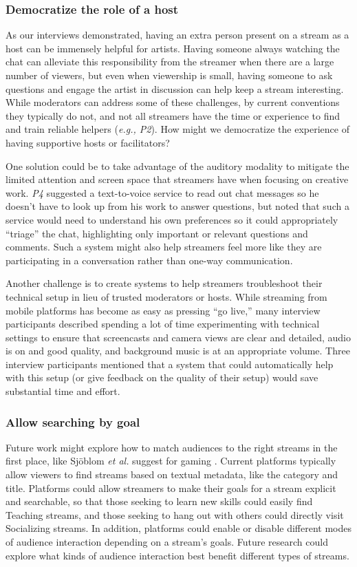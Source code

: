 \subsubsection{Democratize the role of a host}
As our interviews demonstrated, having an extra person present on a stream as a host can be immensely helpful for artists. Having someone always watching the chat can alleviate this responsibility from the streamer when there are a large number of viewers, but even when viewership is small, having someone to ask questions and engage the artist in discussion can help keep a stream interesting. While moderators can address some of these challenges, by current conventions they typically do not, and not all streamers have the time or experience to find and train reliable helpers (\textit{e.g., P2}). How might we democratize the experience of having supportive hosts or facilitators?

One solution could be to take advantage of the auditory modality to mitigate the limited attention and screen space that streamers have when focusing on creative work. \textit{P4} suggested a text-to-voice service to read out chat messages so he doesn't have to look up from his work to answer questions, but noted that such a service would need to understand his own preferences so it could appropriately ``triage'' the chat, highlighting only important or relevant questions and comments. Such a system might also help streamers feel more like they are participating in a conversation rather than one-way communication.

Another challenge is to create systems to help streamers troubleshoot their technical setup in lieu of trusted moderators or hosts. While streaming from mobile platforms has become as easy as pressing ``go live,'' many interview participants described spending a lot of time experimenting with technical settings to ensure that screencasts and camera views are clear and detailed, audio is on and good quality, and background music is at an appropriate volume. Three interview participants mentioned that a system that could automatically help with this setup (or give feedback on the quality of their setup) would save substantial time and effort. 

\subsubsection{Allow searching by goal}
Future work might explore how to match audiences to the right streams in the first place, like Sj{\"{o}}blom \emph{et al.} suggest for gaming \cite{Sjoblom2017a}. Current platforms typically allow viewers to find streams based on textual metadata, like the category and title. Platforms could allow streamers to make their goals for a stream explicit and searchable, so that those seeking to learn new skills could easily find Teaching streams, and those seeking to hang out with others could directly visit Socializing streams. In addition, platforms could enable or disable different modes of audience interaction depending on a stream's goals. Future research could explore what kinds of audience interaction best benefit different types of streams.

